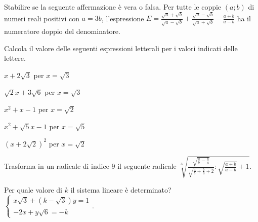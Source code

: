 \begin{esercizio}%
Stabilire se la seguente affermazione è vera o falsa. Per tutte le coppie $(a;b)$ di numeri reali positivi con $a=3b$, l'espressione $E=\frac{\sqrt a+\sqrt b}{\sqrt a-\sqrt b}+\frac{\sqrt a-\sqrt b}{\sqrt a+\sqrt b}-\frac{a+b}{a-b}$ ha il numeratore doppio del denominatore.
\end{esercizio}

\begin{esercizio}%
Calcola il valore delle seguenti espressioni letterali per i valori indicati delle lettere.
\begin{multicols}{3}
\begin{enumeratea}
\item $x+2\sqrt 3$ per $x=\sqrt 3$
\item $\sqrt 2x+3\sqrt 6$ per $x=\sqrt{3}$
\item $x^2+x-1$ per $x=\sqrt 2$
\item $x^2+\sqrt 5x-1$ per $x=\sqrt 5$
\item $(x+2\sqrt 2)^2$ per $x=\sqrt 2$
\end{enumeratea}
\end{multicols}
\end{esercizio}

\begin{esercizio}%
Trasforma in un radicale di indice $9$ il seguente radicale $\sqrt[3]{\frac{\sqrt{\frac a b-\frac b a}}{\sqrt{\frac a b+\frac b a+2}}:\sqrt{\frac{a+b}{a-b}}+1}$.
\end{esercizio}


\begin{esercizio}%
Per quale valore di $k$ il sistema lineare è determinato?
$\left\{\begin{array}{l}{x\sqrt 3+(k-\sqrt 3)y=1}\\
 {-2x+y\sqrt 6=-k} \end{array}\right..$
\end{esercizio}

